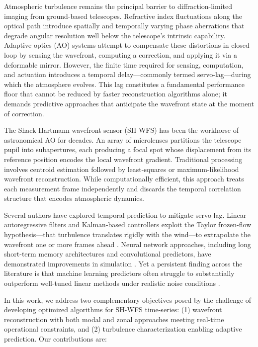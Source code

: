 \documentclass[conference]{IEEEtran}
\begin{document}
Atmospheric turbulence remains the principal barrier to diffraction-limited imaging from ground-based telescopes. Refractive index fluctuations along the optical path introduce spatially and temporally varying phase aberrations that degrade angular resolution well below the telescope's intrinsic capability. Adaptive optics (AO) systems attempt to compensate these distortions in closed loop by sensing the wavefront, computing a correction, and applying it via a deformable mirror. However, the finite time required for sensing, computation, and actuation introduces a temporal delay---commonly termed servo-lag---during which the atmosphere evolves. This lag constitutes a fundamental performance floor that cannot be reduced by faster reconstruction algorithms alone; it demands predictive approaches that anticipate the wavefront state at the moment of correction.

The Shack-Hartmann wavefront sensor (SH-WFS) has been the workhorse of astronomical AO for decades. An array of microlenses partitions the telescope pupil into subapertures, each producing a focal spot whose displacement from its reference position encodes the local wavefront gradient. Traditional processing involves centroid estimation followed by least-squares or maximum-likelihood wavefront reconstruction. While computationally efficient, this approach treats each measurement frame independently and discards the temporal correlation structure that encodes atmospheric dynamics.

Several authors have explored temporal prediction to mitigate servo-lag. Linear autoregressive filters and Kalman-based controllers exploit the Taylor frozen-flow hypothesis---that turbulence translates rigidly with the wind---to extrapolate the wavefront one or more frames ahead \cite{guyon2005,poyneer2007,correia2020}. Neural network approaches, including long short-term memory architectures and convolutional predictors, have demonstrated improvements in simulation \cite{liu2020,swanson2021,shatokhina2023}. Yet a persistent finding across the literature is that machine learning predictors often struggle to substantially outperform well-tuned linear methods under realistic noise conditions \cite{vanKooten2022}.

In this work, we address two complementary objectives posed by the challenge of developing optimized algorithms for SH-WFS time-series: (1) wavefront reconstruction with both modal and zonal approaches meeting real-time operational constraints, and (2) turbulence characterization enabling adaptive prediction. Our contributions are:
\end{document}
